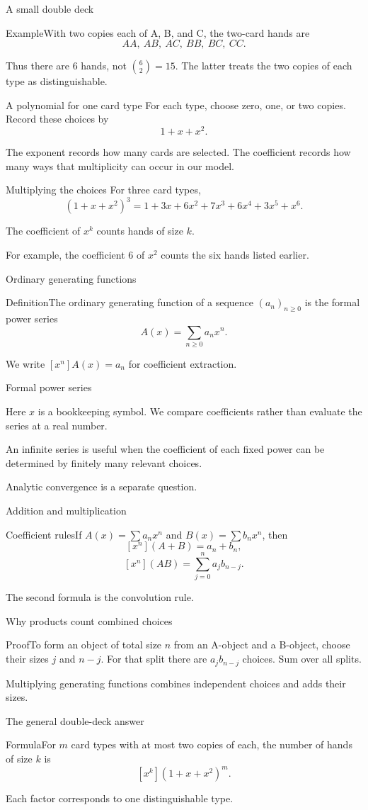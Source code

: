 \documentclass[aspectratio=169,11pt]{beamer}
\newcommand{\Def}[2]{\begin{block}{#1}#2\end{block}}
\newcommand{\Thm}[2]{\begin{block}{#1}#2\end{block}}
\renewcommand{\Proof}[1]{\begin{block}{Proof}\normalsize #1\end{block}}
\renewcommand{\Example}[1]{\begin{block}{Example}#1\end{block}}
\newcommand{\gap}{\par\medskip}
\begin{document}
\begin{frame}{A small double deck}
\large
\Example{With two copies each of A, B, and C, the two-card hands are
\[AA,\ AB,\ AC,\ BB,\ BC,\ CC.\]}
\gap Thus there are $6$ hands, not $\binom62=15$. The latter treats the two copies of each type as distinguishable.
\end{frame}
\begin{frame}{A polynomial for one card type}
\large
For each type, choose zero, one, or two copies. Record these choices by
\[1+x+x^2.\]
\gap The exponent records how many cards are selected. The coefficient records how many ways that multiplicity can occur in our model.
\end{frame}
\begin{frame}{Multiplying the choices}
\large
For three card types,
\[(1+x+x^2)^3=1+3x+6x^2+7x^3+6x^4+3x^5+x^6.\]
\gap The coefficient of $x^k$ counts hands of size $k$.
\gap For example, the coefficient $6$ of $x^2$ counts the six hands listed earlier.
\end{frame}
\begin{frame}{Ordinary generating functions}
\large
\Def{Definition}{The ordinary generating function of a sequence $(a_n)_{n\geq0}$ is the formal power series
\[A(x)=\sum_{n\geq0}a_nx^n.\]}
\gap We write $[x^n]A(x)=a_n$ for coefficient extraction.
\end{frame}
\begin{frame}{Formal power series}
\large
\gap Here $x$ is a bookkeeping symbol. We compare coefficients rather than evaluate the series at a real number.
\gap An infinite series is useful when the coefficient of each fixed power can be determined by finitely many relevant choices.
\gap Analytic convergence is a separate question.
\end{frame}
\begin{frame}{Addition and multiplication}
\large
\Thm{Coefficient rules}{If $A(x)=\sum a_nx^n$ and $B(x)=\sum b_nx^n$, then
\[[x^n](A+B)=a_n+b_n,\]
\[[x^n](AB)=\sum_{j=0}^na_jb_{n-j}.\]}
\gap The second formula is the convolution rule.
\end{frame}
\begin{frame}{Why products count combined choices}
\large
\Proof{To form an object of total size $n$ from an A-object and a B-object, choose their sizes $j$ and $n-j$. For that split there are $a_jb_{n-j}$ choices. Sum over all splits.}
\gap Multiplying generating functions combines independent choices and adds their sizes.
\end{frame}
\begin{frame}{The general double-deck answer}
\large
\Thm{Formula}{For $m$ card types with at most two copies of each, the number of hands of size $k$ is
\[[x^k](1+x+x^2)^m.\]}
\gap Each factor corresponds to one distinguishable type.
\end{frame}
\end{document}
